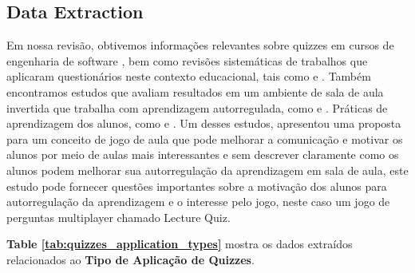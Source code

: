 \subsection{Data Extraction}

Em nossa revisão, obtivemos informações relevantes sobre quizzes em cursos de engenharia de software \cite{figueiredo_evaluation_2014}, bem como revisões sistemáticas de trabalhos que aplicaram questionários neste contexto educacional, tais como \cite{luxton-reilly_introductory_2018} e \cite {crow_intelligent_2018} . Também encontramos estudos que avaliam resultados em um ambiente de sala de aula invertida que trabalha com aprendizagem autorregulada, como \cite{ogawa_evaluation_2018} e \cite{herold_student_2012}. Práticas de aprendizagem dos alunos, como \cite{thevathayan_imparting_2017} e \cite{verdu_distributed_2012}. Um desses estudos, \cite{wu_improvement_2011} apresentou uma proposta para um conceito de jogo de aula que pode melhorar a comunicação e motivar os alunos por meio de aulas mais interessantes e sem descrever claramente como os alunos podem melhorar sua autorregulação da aprendizagem em sala de aula, este estudo pode fornecer questões importantes sobre a motivação dos alunos para autorregulação da aprendizagem  e o interesse pelo jogo, neste caso um jogo de perguntas multiplayer chamado Lecture Quiz.

\textbf{Table \ref{tab:quizzes_application_types}} mostra os dados extraídos relacionados ao \textbf{Tipo de Aplicação de Quizzes}.

